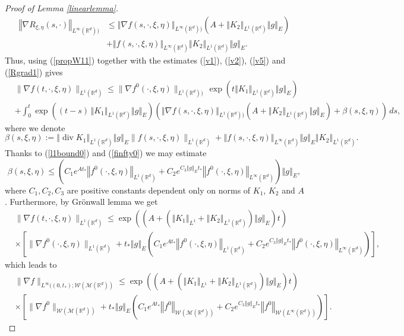 \documentclass[10pt]{article}
\def\divv{\operatorname {div}}
\newcommand*{\norm}[1]{\left\Vert{#1}\right\Vert}
\newcommand{\R}{\mathbb{R}}
\newcommand{\W}{\mathcal{W}}
\begin{document}
\begin{proof}[Proof of Lemma \ref{linearlemma}]
\begin{align}\label{Rgradinfty}
\norm{\nabla R_{\xi,\eta}(s,\cdot)}_{L^{\infty}(\R^d))} &\leq \norm{\nabla f(s,\cdot,\xi,\eta)}_{L^{\infty}(\R^d))}\left(A+\norm{K_{2}}_{L^{1}(\R^d)}\norm{g}_{E}\right) \\ \nonumber
& +\norm{f(s,\cdot,\xi,\eta)}_{L^{\infty}(\R^d)}\norm{K_{2}}_{L^{1}(\R^d)}\norm{g}_{E}.
\end{align}
Thus, using
(\ref{propW11}) together with the estimates (\ref{v1}), (\ref{v2}), (\ref{v5}) and  (\ref{Rgrad1}) gives
\[
  \begin{split}
    &\|\nabla f(t,\cdot,\xi,\eta)\|_{ L^1(\R^d)}\leq \|\nabla f^0(\cdot,\xi,\eta)\|_{L^1(\R^d))}\,\exp\left(t \norm{K_1}_{L^{1}(\R^d)}\norm{g}_{E}\right)\\
        &+\int_0^t \exp\left((t-s)\,\norm{K_1}_{L^{1}(\R^d)}\norm{g}_{E}\right)\left( \norm{\nabla f(s,\cdot,\xi,\eta)}_{L^{1}(\R^d))}\left(A+\norm{K_{2}}_{L^{1}(\R^d)}\norm{g}_{E} \right)+ \beta(s,\xi,\eta) \right)\,ds,
\end{split}
\]
where we denote
\[
\beta(s,\xi,\eta) := \norm{\divv K_1}_{L^{1}(\R^d)}\norm{g}_{E}\| f(s,\cdot,\xi,\eta)\|_{L^1(\R^d)}+\norm{f(s,\cdot,\xi,\eta)}_{L^{\infty}( \R^d)}\norm{g}_{E}   \norm{K_{2}}_{L^{1}(\R^d)}.
\]
Thanks to (\ref{l1bound0}) and (\ref{finfty0}) we may estimate 
\[
\beta(s,\xi,\eta) \leq \left(C_1e^{At_{*}}\norm{f^0(\cdot,\xi,\eta)}_{L^{1}(\R^d)} + C_2e^{C_{3}\norm{g}_{E}t_{*}}\norm{f^0(\cdot,\xi,\eta)}_{L^{\infty}(\R^d)} \right)\norm{g}_{E},
\]
where $C_{1},C_{2},C_{3}$ are positive constants dependent only on norms of $K_{1}$, $K_2$ and $A$.
Furthermore, by Gr\"onwall lemma we get
\begin{align*}
&\|\nabla f(t,\cdot,\xi,\eta)\|_{L^1(\R^d)} \leq \exp\left(\left(A+(\norm{K_{1}}_{L^{1}}+\norm{K_{2}}_{L^{1}(\R^d)})\norm{g}_{E}\right)t\right)\\ \nonumber
&\times \left[ \|\nabla f^0(\cdot,\xi,\eta)\|_{L^1(\R^d)} + t_{*}\norm{g}_{E}\left(C_1e^{At_{*}}\norm{f^0(\cdot,\xi,\eta)}_{L^{1}(\R^d)} + C_2e^{C_{3}\norm{g}_{E}t_{*}}\norm{f^0(\cdot,\xi,\eta)}_{L^{\infty}(\R^d)} \right)\right], 
\end{align*}
which leads to
\begin{align}\label{gradl1}
&\|\nabla f\|_{L^{\infty}((0,t_{*});\W(\mathcal{M}(\R^d))} \leq \exp\left(\left(A+(\norm{K_{1}}_{L^{1}}+\norm{K_{2}}_{L^{1}(\R^d)})\norm{g}_{E}\right)t\right)\\ \nonumber
&\times \left[ \|\nabla f^0\|_{\W(\mathcal{M}(\R^d))} + t_{*}\norm{g}_{E}\left(C_1e^{At_{*}}\norm{f^0}_{\W(\mathcal{M}(\R^d))} + C_2e^{C_{3}\norm{g}_{E}t_{*}}\norm{f^0}_{\W(L^{\infty}(\R^d))} \right)\right] .
\end{align}


\end{proof}
\end{document}
